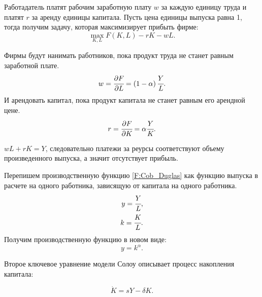 Работадатель платят рабочим заработную плату $w$ за каждую единицу труда и платят $r$ за аренду единицы капитала.
Пусть цена единицы выпуска равна 1, тогда получим задачу, которая максимизирует прибыть фирме:
\begin{equation}
	\max\limits_{K, L} F(K,L) - rK - wL\text{.}
\end{equation}

Фирмы будут нанимать работников, пока продукт труда не станет равным заработной плате.
\begin{equation*}
	w = \cfrac{\partial F}{\partial L} = \left(1-\alpha\right)\cfrac{Y}{L}\text{.}
\end{equation*}
И арендовать капитал, пока продукт капитала не станет равным его арендной цене.
\begin{equation*}
	r = \cfrac{\partial F}{\partial K} = \alpha\cfrac{Y}{K}\text{.}
\end{equation*}

$wL + rK = Y$, следовательно платежи за реурсы соответствуют объему произведенного выпуска, а значит отсутствует прибыль.

Перепишем производственную функцию \ref{F:Cob_Duglas} как функцию выпуска в расчете на одного работника, зависящую от капитала на одного работника.
\begin{align*}
y = \cfrac{Y}{L}\text{,}\\
k = \cfrac{K}{L}\text{.}
\end{align*}
Получим производственную функцию в новом виде:
\begin{equation}
	y = k^{\alpha}\text{.}
\end{equation}

Второе ключевое уравнение модели Солоу описывает процесс накопления капитала:

\begin{equation}
\dot{K} = sY-\delta K \text{.}
\end{equation}

